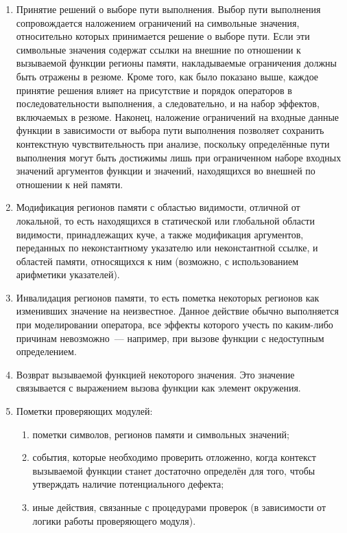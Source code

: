 \begin{enumerate}
 \item Принятие решений о выборе пути выполнения. Выбор пути выполнения сопровождается наложением ограничений на символьные значения, относительно которых принимается решение о выборе пути. Если эти символьные значения содержат ссылки на внешние по отношении к вызываемой функции регионы памяти, накладываемые ограничения должны быть отражены в резюме. Кроме того, как было показано выше, каждое принятие решения влияет на присутствие и порядок операторов в последовательности выполнения, а следовательно, и на набор эффектов, включаемых в резюме. Наконец, наложение ограничений на входные данные функции в зависимости от выбора пути выполнения позволяет сохранить контекстную чувствительность при анализе, поскольку определённые пути выполнения могут быть достижимы лишь при ограниченном наборе входных значений аргументов функции и значений, находящихся во внешней по отношении к ней памяти.
 
 \item Модификация регионов памяти с областью видимости, отличной от локальной, то есть находящихся в статической или глобальной области видимости, принадлежащих куче, а также модификация аргументов, переданных по неконстантному указателю или неконстантной ссылке, и областей памяти, относящихся к ним (возможно, с использованием арифметики указателей).
 
 \item Инвалидация регионов памяти, то есть пометка некоторых регионов как изменивших значение на неизвестное. Данное действие обычно выполняется при моделировании оператора, все эффекты которого учесть по каким-либо причинам невозможно~--- например, при вызове функции с недоступным определением.
 
 \item Возврат вызываемой функцией некоторого значения. Это значение связывается с выражением вызова функции как элемент окружения.
 
 \item Пометки проверяющих модулей:
 
 \begin{enumerate}
  \item пометки символов, регионов памяти и символьных значений;
  \item события, которые необходимо проверить отложенно, когда контекст вызываемой функции станет достаточно определён для того, чтобы утверждать наличие потенциального дефекта;
  \item иные действия, связанные с процедурами проверок (в зависимости от логики работы проверяющего модуля).
 \end{enumerate}
 
\end{enumerate}

